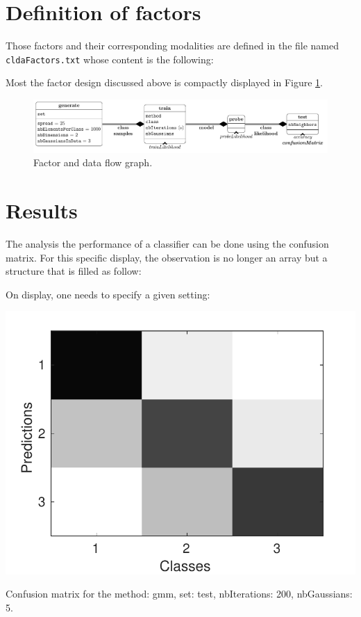 \documentclass[12pt,a4paper,fleqn]{tufte-handout}
\begin{document}


\section{Definition of factors}  


Those factors and their corresponding modalities are defined in the file named \texttt{cldaFactors.txt} whose content is the following:


 Most the factor design discussed above is compactly displayed in Figure \ref{factorFlowGraph}.

\begin{figure}
\includegraphics[width=\textwidth]{figures/factors}
\caption{Factor and data flow graph.}
\label{factorFlowGraph}
\end{figure}

\section{Results}






The analysis the performance of a classifier can be done using the confusion matrix. For this specific display, the observation is no longer an array but a structure that is filled as follow:



On display, one needs to specify a given setting:



\begin{marginfigure}
\includegraphics[width=\textwidth]{figures/confusion}
\caption{Confusion matrix for the method: gmm, set: test, nbIterations: 200, nbGaussians: 5.}
\label{confusion}
\end{marginfigure}
\end{document}
